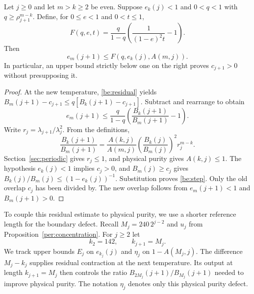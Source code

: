 \begin{lemma}\label{be:recurrence}
Let $j\ge0$ and let $m>k\ge2$ be even. Suppose $e_k(j)<1$ and
$0<q<1$ with $q\ge\rho_{j+1}^{m-k}$. Define, for
$0\le e<1$ and $0<t\le1$,
\begin{equation}\label{be:F}
 F(q,e,t)=\frac{q}{1-q}\left(\frac{1}{(1-e)^2t}-1\right).
\end{equation}
Then
\begin{equation}\label{be:step}
 e_m(j+1)\le F(q,e_k(j),A(m,j)).
\end{equation}
In particular, an upper bound strictly below one on the right proves
$c_{j+1}>0$ without presupposing it.
\end{lemma}
\begin{proof}
At the new temperature, \eqref{be:residual} yields
$B_m(j+1)-c_{j+1}\le q[B_k(j+1)-c_{j+1}]$.
Subtract and rearrange to obtain
\[
 e_m(j+1)\le\frac{q}{1-q}
                   \left(\frac{B_k(j+1)}{B_m(j+1)}-1\right).
\]
Write $r_j=\lambda_{j+1}/\lambda_j^2$. From the definitions,
\begin{equation}\label{be:ratio}
 \frac{B_k(j+1)}{B_m(j+1)}
 =\frac{A(k,j)}{A(m,j)}
   \left(\frac{B_k(j)}{B_m(j)}\right)^2 r_j^{m-k}.
\end{equation}
Section~\ref{sec:periodic} gives $r_j\le1$, and physical purity gives
$A(k,j)\le1$. The hypothesis $e_k(j)<1$ implies $c_j>0$, and
$B_m(j)\ge c_j$ gives
$B_k(j)/B_m(j)\le(1-e_k(j))^{-1}$.
Substitution proves \eqref{be:step}. Only the old overlap $c_j$ has
been divided by. The new overlap follows from
$e_m(j+1)<1$ and $B_m(j+1)>0$.
\end{proof}

To couple this residual estimate to physical purity, we use a shorter
reference length for the boundary defect. Recall $M_j=240\,2^{j-2}$ and
$u_j$ from Proposition~\ref{per:concentration}. For $j\ge2$ let
\begin{equation}\label{be:k}
 k_2=142,\qquad k_{j+1}=M_j.
\end{equation}
We track upper bounds $E_j$ on $e_{k_j}(j)$ and $\eta_j$ on
$1-A(M_j,j)$. The difference $M_j-k_j$ supplies residual contraction
at the next temperature. Its output at length $k_{j+1}=M_j$ then
controls the ratio $B_{2M_j}(j+1)/B_{M_j}(j+1)$ needed to improve
physical purity. The notation $\eta_j$ denotes only this physical
purity defect.

